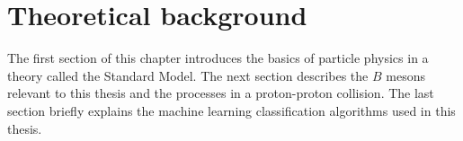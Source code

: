 \chapter{Theoretical background}

The first section of this chapter introduces the basics of particle physics in a theory called the Standard Model.
The next section describes the $B$ mesons relevant to this thesis and the processes in a proton-proton collision.
The last section briefly explains the machine learning classification algorithms used in this thesis.




